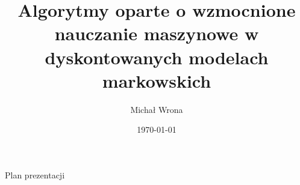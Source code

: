 \documentclass[aspectratio=169]{beamer}
\title{Algorytmy oparte o wzmocnione nauczanie maszynowe w dyskontowanych modelach markowskich}
\author{Michał Wrona}
\institute{Politechnika Wrocławska\\Promotor: prof. dr hab. inż. Anna Jaśkiewicz}
\date{\today}
\begin{document}


\begin{frame}{Plan prezentacji}
	\tableofcontents
\end{frame}








\end{document}
